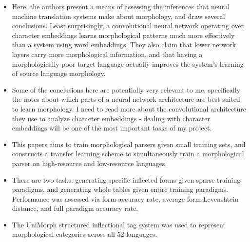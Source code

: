 \documentclass[12pt]{report}
\begin{document}
\begin{itemize}

	\item Here, the authors present a means of assessing the inferences that neural machine translation systems make about morphology, and draw several conclusions. Least surprisingly, a convolutional neural network operating over character embeddings learns morphological patterns much more effectively than a system using word embeddings. They also claim that lower network layers carry more morphological information, and that having a morphologically poor target language actually improves the system's learning of source language morphology.
	
	\item Some of the conclusions here are potentially very relevant to me, specifically the notes about which parts of a neural network architecture are best suited to learn morphology. I need to read more about the convolutional architecture they use to analyze character embeddings - dealing with character embeddings will be one of the most important tasks of my project.

\end{itemize}


\begin{itemize}
	
	\item This papers aims to train morphological parsers given small training sets, and constructs a transfer learning scheme to simultaneously train a morphological parser on high-resource and low-resource languages.
	
	\item There are two tasks: generating specific inflected forms given sparse training paradigms, and generating whole tables given entire training paradigms. Performance was assessed via form accuracy rate, average form Levenshtein distance, and full paradigm accuracy rate.
	
	\item The UniMorph structured inflectional tag system \cite{SylakGlassman2015} \cite{SylakGlassman2015a} \cite{SylakGlassman2016} was used to represent morphological categories across all 52 languages.
	
\end{itemize}

\end{document}
